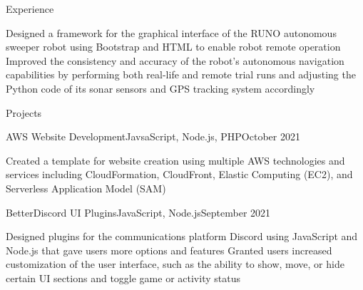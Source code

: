 \documentclass[11pt]{cv_template}
\begin{document}
\begin{cv}
\begin{cvsection}{Experience}
\begin{cvsubsection}
\listitem Designed a framework for the graphical interface of the RUNO autonomous sweeper robot using Bootstrap and HTML to enable robot remote operation
\listitem Improved the consistency and accuracy of the robot's autonomous navigation capabilities by performing both real-life and remote trial runs and adjusting the Python code of its sonar sensors and GPS tracking system accordingly

\end{cvsubsection}


\end{cvsection}


\begin{cvsection}{Projects}


\begin{cvsubsection}
{AWS Website Development}{JavsaScript, Node.js, PHP}{October 2021}{}

\listitem Created a template for website creation using multiple AWS technologies and services including CloudFormation, CloudFront, Elastic Computing (EC2), and Serverless Application Model (SAM)

\end{cvsubsection}


\begin{cvsubsection}
{BetterDiscord UI Plugins}{JavaScript, Node.js}{September 2021}{}

\listitem Designed plugins for the communications platform Discord using JavaScript and Node.js that gave users more options and features
\listitem Granted users increased customization of the user interface, such as the ability to show, move, or hide certain UI sections and toggle game or activity status

\end{cvsubsection}





\end{cvsection}
\end{cv}
\end{document}
